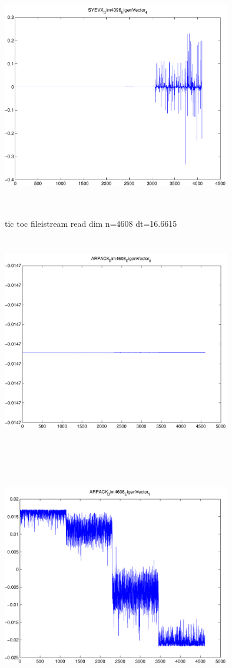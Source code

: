 \documentclass[9pt]{article}
\theoremstyle{plain}
\theoremstyle{definition}
\theoremstyle{remark}
\numberwithin{equation}{section}
\begin{document}
\includegraphics[width=10.0cm,height=10.0cm]{SYEVX_Dim4096_EigenVector_4.pdf}

tic toc fileistream read dim n=4608 dt=16.6615
\includegraphics[width=10.0cm,height=10.0cm]{ARPACK_Dim4608_EigenVector_0.pdf}

\includegraphics[width=10.0cm,height=10.0cm]{ARPACK_Dim4608_EigenVector_1.pdf}
\end{document}
